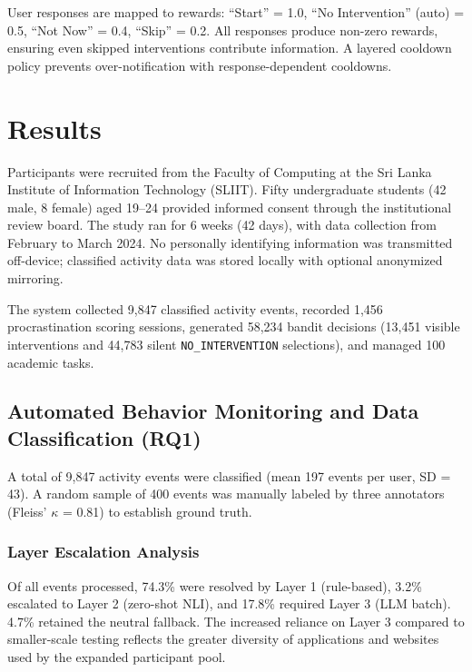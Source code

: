 \documentclass[conference]{IEEEtran}
\begin{document}
User responses are mapped to rewards: ``Start'' = 1.0, ``No Intervention'' (auto) = 0.5, ``Not Now'' = 0.4, ``Skip'' = 0.2. All responses produce non-zero rewards, ensuring even skipped interventions contribute information. A layered cooldown policy prevents over-notification with response-dependent cooldowns.

\section{Results}

Participants were recruited from the Faculty of Computing at the Sri Lanka Institute of Information Technology (SLIIT). Fifty undergraduate students (42 male, 8 female) aged 19--24 provided informed consent through the institutional review board. The study ran for 6 weeks (42 days), with data collection from February to March 2024. No personally identifying information was transmitted off-device; classified activity data was stored locally with optional anonymized mirroring.

The system collected 9{,}847 classified activity events, recorded 1{,}456 procrastination scoring sessions, generated 58{,}234 bandit decisions (13{,}451 visible interventions and 44{,}783 silent \texttt{NO\_INTERVENTION} selections), and managed 100 academic tasks.

\subsection{Automated Behavior Monitoring and Data Classification (RQ1)}

A total of 9,847 activity events were classified (mean 197 events per user, SD = 43). A random sample of 400 events was manually labeled by three annotators (Fleiss' $\kappa$ = 0.81) to establish ground truth.

\subsubsection{Layer Escalation Analysis}
Of all events processed, 74.3\% were resolved by Layer 1 (rule-based), 3.2\% escalated to Layer 2 (zero-shot NLI), and 17.8\% required Layer 3 (LLM batch). 4.7\% retained the neutral fallback. The increased reliance on Layer 3 compared to smaller-scale testing reflects the greater diversity of applications and websites used by the expanded participant pool.
\end{document}

